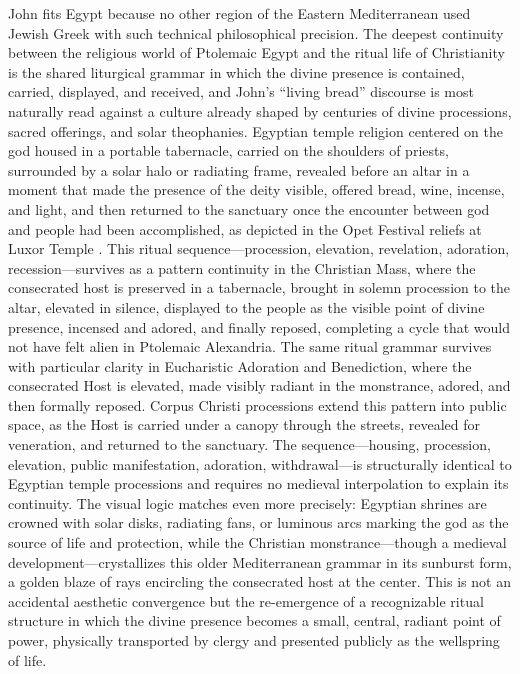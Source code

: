 John fits Egypt because no other region of the Eastern Mediterranean used Jewish Greek with such technical philosophical precision.
The deepest continuity between the religious world of Ptolemaic Egypt and the ritual life of Christianity is the shared liturgical grammar in which the divine presence is contained, carried, displayed, and received, and John's ``living bread'' discourse is most naturally read against a culture already shaped by centuries of divine processions, sacred offerings, and solar theophanies.
Egyptian temple religion centered on the god housed in a portable tabernacle, carried on the shoulders of priests, surrounded by a solar halo or radiating frame, revealed before an altar in a moment that made the presence of the deity visible, offered bread, wine, incense, and light, and then returned to the sanctuary once the encounter between god and people had been accomplished, as depicted in the Opet Festival reliefs at Luxor Temple \cite{epigraphicsurvey:luxor}.
This ritual sequence---procession, elevation, revelation, adoration, recession---survives as a pattern continuity in the Christian Mass, where the consecrated host is preserved in a tabernacle, brought in solemn procession to the altar, elevated in silence, displayed to the people as the visible point of divine presence, incensed and adored, and finally reposed, completing a cycle that would not have felt alien in Ptolemaic Alexandria.
The same ritual grammar survives with particular clarity in Eucharistic Adoration and Benediction, where the consecrated Host is elevated, made visibly radiant in the monstrance, adored, and then formally reposed.
Corpus Christi processions extend this pattern into public space, as the Host is carried under a canopy through the streets, revealed for veneration, and returned to the sanctuary.
The sequence---housing, procession, elevation, public manifestation, adoration, withdrawal---is structurally identical to Egyptian temple processions and requires no medieval interpolation to explain its continuity.
The visual logic matches even more precisely: Egyptian shrines are crowned with solar disks, radiating fans, or luminous arcs marking the god as the source of life and protection, while the Christian monstrance---though a medieval development---crystallizes this older Mediterranean grammar in its sunburst form, a golden blaze of rays encircling the consecrated host at the center.
This is not an accidental aesthetic convergence but the re-emergence of a recognizable ritual structure in which the divine presence becomes a small, central, radiant point of power, physically transported by clergy and presented publicly as the wellspring of life.
